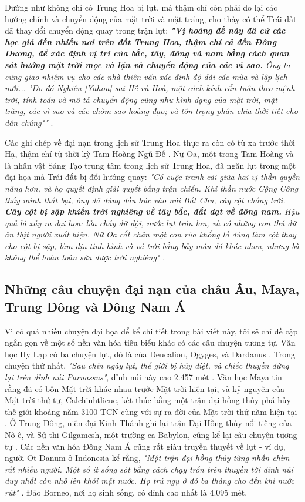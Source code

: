 \documentclass[10pt,twocolumn,letterpaper]{article}
\begin{document}
Dường như không chỉ có Trung Hoa bị lụt, mà thậm chí còn phải đo lại các hướng chính và chuyển động của mặt trời và mặt trăng, cho thấy có thể Trái đất đã thay đổi chuyển động quay trong trận lụt: \textit{\textbf{"Vị hoàng đế này đã cử các học giả đến nhiều nơi trên đất Trung Hoa, thậm chí cả đến Đông Dương, để xác định vị trí của bắc, tây, đông và nam bằng cách quan sát hướng mặt trời mọc và lặn và chuyển động của các vì sao.} Ông ta cũng giao nhiệm vụ cho các nhà thiên văn xác định độ dài các mùa và lập lịch mới... "Do đó Nghiêu [Yahou] sai Hề và Hoà, một cách kính cẩn tuân theo mệnh trời, tính toán và mô tả chuyển động cũng như hình dạng của mặt trời, mặt trăng, các vì sao và các chòm sao hoàng đạo; và tôn trọng phân chia thời tiết cho dân chúng""} \cite{5}.

Các ghi chép về đại nạn trong lịch sử Trung Hoa thực ra còn có từ xa trước thời Hạ, thậm chí từ thời kỳ Tam Hoàng Ngũ Đế \cite{7}. Nữ Oa, một trong Tam Hoàng và là nhân vật Sáng Tạo trung tâm trong lịch sử Trung Hoa, đã ngăn lụt trong một đại họa mà Trái đất bị đổi hướng quay: \textit{"Có cuộc tranh cãi giữa hai vị thần quyền năng hơn, và họ quyết định giải quyết bằng trận chiến. Khi thần nước Cộng Công thấy mình thất bại, ông đã dùng đầu húc vào núi Bất Chu, cây cột chống trời. \textbf{Cây cột bị sập khiến trời nghiêng về tây bắc, đất dạt về đông nam.} Hậu quả là xảy ra đại họa: lửa cháy dữ dội, nước lụt tràn lan, và có những con thú dữ ăn thịt người xuất hiện. Nữ Oa cắt chân một con rùa khổng lồ dùng làm cột thay cho cột bị sập, làm dịu tình hình và vá trời bằng bảy màu đá khác nhau, nhưng bà không thể hoàn toàn sửa được trời nghiêng"} \cite{8}.

\subsection{Những câu chuyện đại nạn của châu Âu, Maya, Trung Đông và Đông Nam Á}

Vì có quá nhiều chuyện đại họa để kể chi tiết trong bài viết này, tôi sẽ chỉ đề cập ngắn gọn về một số nền văn hóa tiêu biểu khác có các câu chuyện tương tự. Văn học Hy Lạp có ba chuyện lụt, đó là của Deucalion, Ogyges, và Dardanus \cite{9,10}. Trong chuyện thứ nhất, \textit{"Sau chín ngày lụt, thế giới bị hủy diệt, và chiếc thuyền dừng lại trên đỉnh núi Parnassus"}, đỉnh núi này cao 2.457 mét \cite{11}. Văn học Maya tin rằng đã có bốn Mặt trời khác nhau trước Mặt trời hiện tại, và kỷ nguyên của Mặt trời thứ tư, Calchiuhtlicue, kết thúc bằng một trận đại hồng thủy phá hủy thế giới khoảng năm 3100 TCN cùng với sự ra đời của Mặt trời thứ năm hiện tại \cite{12}. Ở Trung Đông, niên đại Kinh Thánh ghi lại trận Đại Hồng thủy nổi tiếng của Nô-ê, và Sử thi Gilgamesh, một trường ca Babylon, cũng kể lại câu chuyện tương tự \cite{13}. Các nền văn hóa Đông Nam Á cũng rất giàu truyền thuyết về lụt - ví dụ, người Ot Danum ở Indonesia kể rằng, \textit{"Một trận đại hồng thủy từng nhấn chìm rất nhiều người. Một số ít sống sót bằng cách chạy trốn trên thuyền tới đỉnh núi duy nhất còn nhô lên khỏi mặt nước. Họ trú ngụ ở đó ba tháng cho đến khi nước rút"} \cite{3}. Đảo Borneo, nơi họ sinh sống, có đỉnh cao nhất là 4.095 mét.
\end{document}
